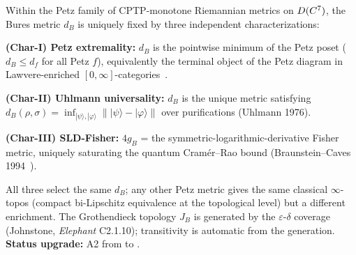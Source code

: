 \begin{theorembox}
Within the Petz family of CPTP-monotone Riemannian metrics on $D(C^7)$, the
Bures metric $d_B$ is uniquely fixed by three independent characterizations:

\textbf{(Char-I) Petz extremality:} $d_B$ is the pointwise minimum of the Petz poset
($d_B \le d_f$ for all Petz $f$), equivalently the terminal object of the Petz diagram
in Lawvere-enriched $[0,\infty]$-categories~\cite{lawvere1973}.

\textbf{(Char-II) Uhlmann universality:} $d_B$ is the unique metric satisfying
$d_B(\rho,\sigma) = \inf_{|\psi\rangle,|\varphi\rangle}\||\psi\rangle - |\varphi\rangle\|$
over purifications (Uhlmann 1976).

\textbf{(Char-III) SLD-Fisher:} $4g_B$ = the symmetric-logarithmic-derivative Fisher metric,
uniquely saturating the quantum Cram\'{e}r--Rao bound (Braunstein--Caves 1994~\cite{braunstein1994}).

All three select the same $d_B$; any other Petz metric gives the same classical
$\infty$-topos (compact bi-Lipschitz equivalence at the topological level) but a different
enrichment. The Grothendieck topology $J_B$ is generated by the $\varepsilon$-$\delta$
coverage (Johnstone, \emph{Elephant} C2.1.10); transitivity is automatic from the generation.
\textbf{Status upgrade:} A2 from  to .
\end{theorembox}

